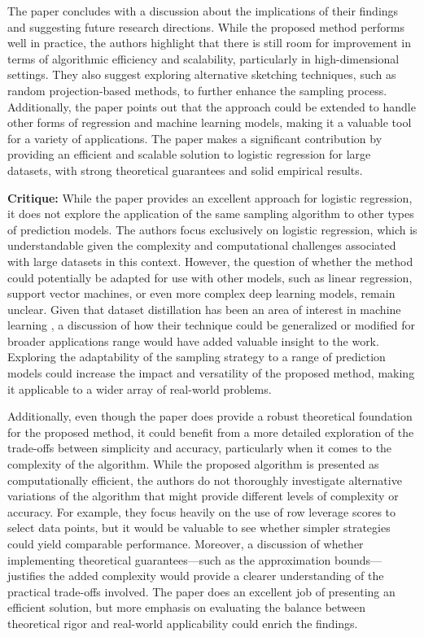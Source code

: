 \documentclass{article}
\theoremstyle{plain}
\theoremstyle{definition}
\theoremstyle{remark}
\begin{document}
The paper concludes with a discussion about the implications of their findings and suggesting future research directions. While the proposed method performs well in practice, the authors highlight that there is still room for improvement in terms of algorithmic efficiency and scalability, particularly in high-dimensional settings. They also suggest exploring alternative sketching techniques, such as random projection-based methods, to further enhance the sampling process. Additionally, the paper points out that the approach could be extended to handle other forms of regression and machine learning models, making it a valuable tool for a variety of applications. The paper makes a significant contribution by providing an efficient and scalable solution to logistic regression for large datasets, with strong theoretical guarantees and solid empirical results.

\textbf{Critique:} While the paper provides an excellent approach for logistic regression, it does not explore the application of the same sampling algorithm to other types of prediction models. The authors focus exclusively on logistic regression, which is understandable given the complexity and computational challenges associated with large datasets in this context. However, the question of whether the method could potentially be adapted for use with other models, such as linear regression, support vector machines, or even more complex deep learning models, remain unclear. Given that dataset distillation has been an area of interest in machine learning \cite{liu23}, a discussion of how their technique could be generalized or modified for broader applications range would have added valuable insight to the work. Exploring the adaptability of the sampling strategy to a range of prediction models could increase the impact and versatility of the proposed method, making it applicable to a wider array of real-world problems.

Additionally, even though the paper does provide a robust theoretical foundation for the proposed method, it could benefit from a more detailed exploration of the trade-offs between simplicity and accuracy, particularly when it comes to the complexity of the algorithm. While the proposed algorithm is presented as computationally efficient, the authors do not thoroughly investigate alternative variations of the algorithm that might provide different levels of complexity or accuracy. For example, they focus heavily on the use of row leverage scores to select data points, but it would be valuable to see whether simpler strategies could yield comparable performance. Moreover, a discussion of whether implementing theoretical guarantees—such as the approximation bounds—justifies the added complexity would provide a clearer understanding of the practical trade-offs involved. The paper does an excellent job of presenting an efficient solution, but more emphasis on evaluating the balance between theoretical rigor and real-world applicability could enrich the findings.
\end{document}
